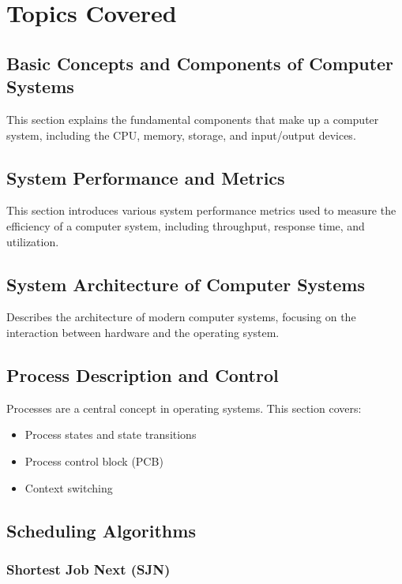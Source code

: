 \documentclass[12pt]{article}
\begin{document}
\section{Topics Covered}

\subsection{Basic Concepts and Components of Computer Systems}
This section explains the fundamental components that make up a computer system, including the CPU, memory, storage, and input/output devices.

\subsection{System Performance and Metrics}
This section introduces various system performance metrics used to measure the efficiency of a computer system, including throughput, response time, and utilization.

\subsection{System Architecture of Computer Systems}
Describes the architecture of modern computer systems, focusing on the interaction between hardware and the operating system.

\subsection{Process Description and Control}
Processes are a central concept in operating systems. This section covers:
\begin{itemize}
    \item Process states and state transitions
    \item Process control block (PCB)
    \item Context switching
\end{itemize}


\subsection{Scheduling Algorithms}
\subsubsection{Shortest Job Next (SJN)}
\end{document}
